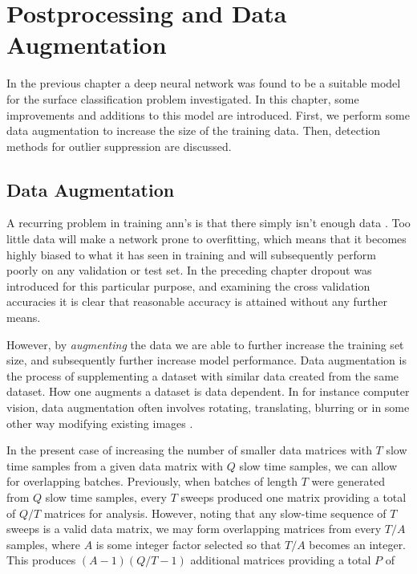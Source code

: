 \chapter{Postprocessing and Data Augmentation}

In the previous chapter a deep neural network was found to be a suitable model for the surface classification problem investigated. In this chapter, some improvements and additions to this model are introduced. First, we perform some data augmentation to increase the size of the training data. Then, detection methods for outlier suppression are discussed.


\section{Data Augmentation}

A recurring problem in training \gls{ann}'s is that there simply isn't enough data \citep{lemley_bazrafkan_corcoran_2017}. Too little data will make a network prone to overfitting, which means that it becomes highly biased to what it has seen in training and will subsequently perform poorly on any validation or test set. In the preceding chapter dropout was introduced for this particular purpose, and examining the cross validation accuracies it is clear that reasonable accuracy is attained without any further means.

However, by \emph{augmenting} the data we are able to further increase the training set size, and subsequently further increase model performance. Data augmentation is the process of supplementing a dataset with similar data created from the same dataset. How one augments a dataset is data dependent. In for instance computer vision, data augmentation often involves rotating, translating, blurring or in some other way modifying existing images \citep{lemley_bazrafkan_corcoran_2017}.

In the present case of increasing the number of smaller data matrices with $T$ slow time samples from a given data matrix with $Q$ slow time samples, we can allow for overlapping batches. Previously, when batches of length $T$ were generated from $Q$ slow time samples, every $T$ sweeps produced one matrix providing a total of $Q/T$ matrices for analysis. However, noting that any slow-time sequence of $T$ sweeps is a valid data matrix, we may form overlapping matrices from every $T/A$ samples, where $A$ is some integer factor selected so that $T/A$ becomes an integer. This produces $(A-1)(Q/T-1)$ additional matrices providing a total $P$ of

